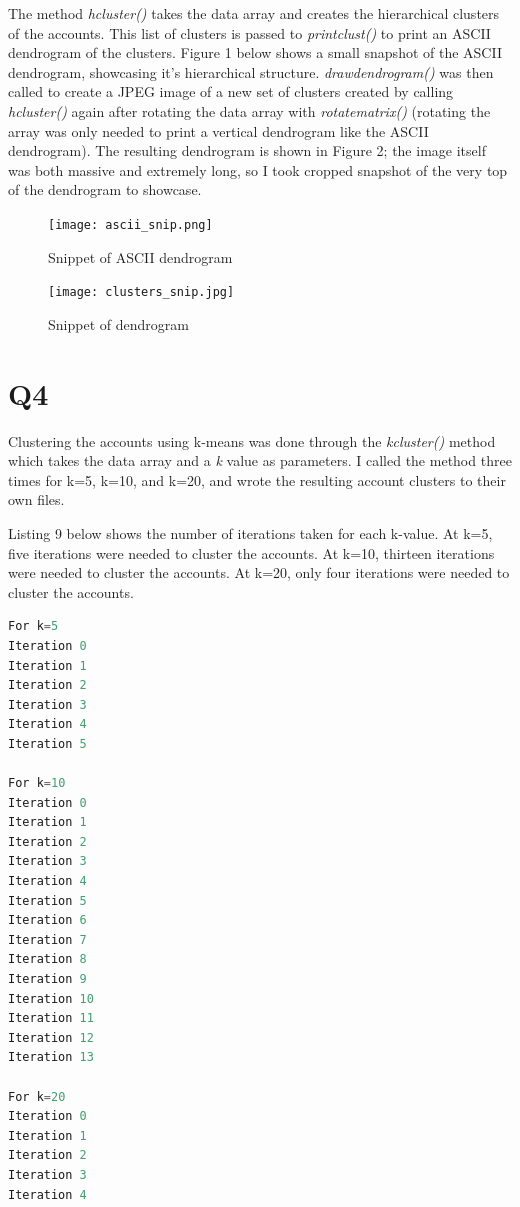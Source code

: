 \documentclass[12pt]{article}
\begin{document}
\par The method \emph{hcluster()} takes the data array and creates the hierarchical clusters of the accounts. This list of clusters is passed to \emph{printclust()} to print an ASCII dendrogram of the clusters. Figure 1 below shows a small snapshot of the ASCII dendrogram, showcasing it's hierarchical structure. \emph{drawdendrogram()} was then called to create a JPEG image of a new set of clusters created by calling \emph{hcluster()} again after rotating the data array with \emph{rotatematrix()} (rotating the array was only needed to print a vertical dendrogram like the ASCII dendrogram). The resulting dendrogram is shown in Figure 2; the image itself was both massive and extremely long, so I took cropped snapshot of the very top of the dendrogram to showcase. 

\begin{figure}[H]
            \centering
            \texttt{[image: ascii\_snip.png]}
            \caption{Snippet of ASCII dendrogram}
            \label{fig:my_label}
        \end{figure}

\begin{figure}[H]
            \centering
            \texttt{[image: clusters\_snip.jpg]}
            \caption{Snippet of dendrogram}
            \label{fig:my_label}
        \end{figure}

\section*{Q4}
Clustering the accounts using k-means was done through the \emph{kcluster()} method which takes the data array and a \emph{k} value as parameters. I called the method three times for k=5, k=10, and k=20, and wrote the resulting account clusters to their own files.

Listing 9 below shows the number of iterations taken for each k-value. At k=5, five iterations were needed to cluster the accounts. At k=10, thirteen iterations were needed to cluster the accounts. At k=20, only four iterations were needed to cluster the accounts.

\begin{lstlisting}[language=Python, caption={Iterations for each k-value}, label=lst:copy]
For k=5
Iteration 0
Iteration 1
Iteration 2
Iteration 3
Iteration 4
Iteration 5

For k=10
Iteration 0
Iteration 1
Iteration 2
Iteration 3
Iteration 4
Iteration 5
Iteration 6
Iteration 7
Iteration 8
Iteration 9
Iteration 10
Iteration 11
Iteration 12
Iteration 13

For k=20
Iteration 0
Iteration 1
Iteration 2
Iteration 3
Iteration 4
\end{lstlisting}
\end{document}
